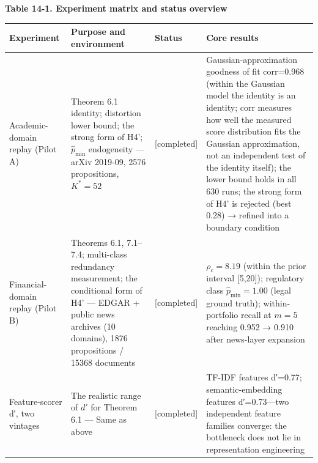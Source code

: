 \documentclass[
  11pt]{article}
\begin{document}
\textbf{Table 14-1. Experiment matrix and status overview}

\begin{longtable}[]{@{}
  >{\raggedright\arraybackslash}p{}
  >{\raggedright\arraybackslash}p{}
  >{\raggedright\arraybackslash}p{}
  >{\raggedright\arraybackslash}p{}@{}}
\toprule\noalign{}
\begin{minipage}[b]{\linewidth}\raggedright
Experiment
\end{minipage} & \begin{minipage}[b]{\linewidth}\raggedright
Purpose and environment
\end{minipage} & \begin{minipage}[b]{\linewidth}\raggedright
Status
\end{minipage} & \begin{minipage}[b]{\linewidth}\raggedright
Core results
\end{minipage} \\
\midrule\noalign{}
\endhead
\bottomrule\noalign{}
\endlastfoot
Academic-domain replay (Pilot A) & Theorem 6.1 identity; distortion
lower bound; the strong form of H4'; \(\hat p_{\min}\) endogeneity ---
arXiv 2019-09, 2576 propositions, \(K^*=52\) & {[}completed{]} &
Gaussian-approximation goodness of fit corr=0.968 (within the Gaussian
model the identity is an identity; corr measures how well the measured
score distribution fits the Gaussian approximation, not an independent
test of the identity itself); the lower bound holds in all 630 runs; the
strong form of H4' is rejected (best 0.28) → refined into a boundary
condition \\
Financial-domain replay (Pilot B) & Theorems 6.1, 7.1--7.4; multi-class
redundancy measurement; the conditional form of H4' --- EDGAR + public
news archives (10 domains), 1876 propositions / 15368 documents &
{[}completed{]} & \(\rho_c=8.19\) (within the prior interval
{[}5,20{]}); regulatory class \(\hat p_{\min}=1.00\) (legal ground
truth); within-portfolio recall at \(m{=}5\) reaching 0.952 → 0.910
after news-layer expansion \\
Feature-scorer d′, two vintages & The realistic range of \(d'\) for
Theorem 6.1 --- Same as above & {[}completed{]} & TF-IDF features
d′=0.77; semantic-embedding features d′=0.73---two independent feature
families converge: the bottleneck does not lie in representation
engineering \\

\end{longtable}
\end{document}
